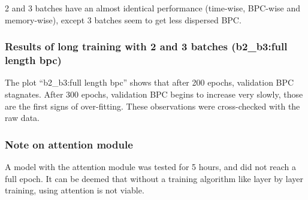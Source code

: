 2 and 3 batches have an almost identical performance (time-wise,
BPC-wise and memory-wise), except 3 batches seem to get less dispersed
BPC.

\subsubsection{Results of long training with 2 and 3 batches
(b2\_b3:full length
bpc)}\label{results-of-long-training-with-2-and-3-batches-b2_b3full-length-bpc}

The plot ``b2\_b3:full length bpc'' shows that after 200 epochs,
validation BPC stagnates. After 300 epochs, validation BPC begins to
increase very slowly, those are the first signs of over-fitting. These
observations were cross-checked with the raw data.

\subsubsection{Note on attention module}\label{note-on-attention-module}

A model with the attention module was tested for 5 hours, and did not
reach a full epoch. It can be deemed that without a training algorithm
like layer by layer training, using attention is not viable.
